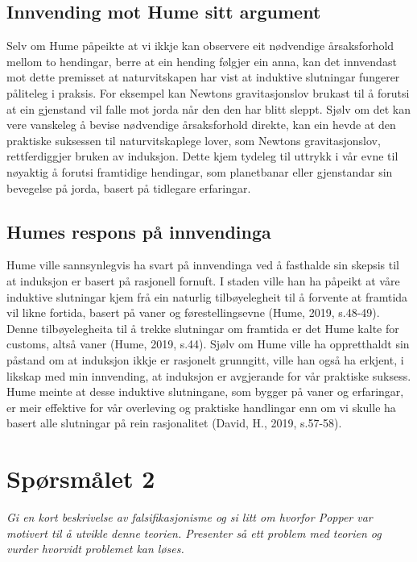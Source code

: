 \documentclass[
  letterpaper,
  DIV=11,
  numbers=noendperiod]{scrreprt}
\begin{document}
\subsection{Innvending mot Hume sitt
argument}\label{innvending-mot-hume-sitt-argument}

Selv om Hume påpeikte at vi ikkje kan observere eit nødvendige
årsaksforhold mellom to hendingar, berre at ein hending følgjer ein
anna, kan det innvendast mot dette premisset at naturvitskapen har vist
at induktive slutningar fungerer påliteleg i praksis. For eksempel kan
Newtons gravitasjonslov brukast til å forutsi at ein gjenstand vil falle
mot jorda når den den har blitt sleppt. Sjølv om det kan vere vanskeleg
å bevise nødvendige årsaksforhold direkte, kan ein hevde at den
praktiske suksessen til naturvitskaplege lover, som Newtons
gravitasjonslov, rettferdiggjer bruken av induksjon. Dette kjem tydeleg
til uttrykk i vår evne til nøyaktig å forutsi framtidige hendingar, som
planetbanar eller gjenstandar sin bevegelse på jorda, basert på
tidlegare erfaringar.

\subsection{Humes respons på
innvendinga}\label{humes-respons-puxe5-innvendinga}

Hume ville sannsynlegvis ha svart på innvendinga ved å fasthalde sin
skepsis til at induksjon er basert på rasjonell fornuft. I staden ville
han ha påpeikt at våre induktive slutningar kjem frå ein naturlig
tilbøyelegheit til å forvente at framtida vil likne fortida, basert på
vaner og førestellingsevne (Hume, 2019, s.48-49). Denne tilbøyelegheita
til å trekke slutningar om framtida er det Hume kalte for customs, altså
vaner (Hume, 2019, s.44). Sjølv om Hume ville ha oppretthaldt sin
påstand om at induksjon ikkje er rasjonelt grunngitt, ville han også ha
erkjent, i likskap med min innvending, at induksjon er avgjerande for
vår praktiske suksess. Hume meinte at desse induktive slutningane, som
bygger på vaner og erfaringar, er meir effektive for vår overleving og
praktiske handlingar enn om vi skulle ha basert alle slutningar på rein
rasjonalitet (David, H., 2019, s.57-58).

\section{Spørsmålet 2}\label{spuxf8rsmuxe5let-2}

\emph{Gi en kort beskrivelse av falsifikasjonisme og si litt om hvorfor
Popper var motivert til å utvikle denne teorien. Presenter så ett
problem med teorien og vurder hvorvidt problemet kan løses.}
\end{document}
